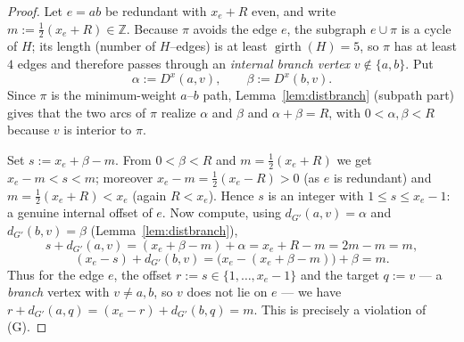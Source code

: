 \documentclass{amsart}
\theoremstyle{definition}
\begin{document}
\begin{proof}
Let $e=ab$ be redundant with $x_e+R$ even, and write $m:=\tfrac12(x_e+R)\in
\mathbb Z$. Because $\pi$ avoids the edge $e$, the subgraph $e\cup\pi$ is a cycle
of $H$; its length (number of $H$--edges) is at least
$\operatorname{girth}(H)=5$, so $\pi$ has at least $4$ edges and therefore passes
through an \emph{internal branch vertex} $v\notin\{a,b\}$. Put
\[
 \alpha:=D^x(a,v),\qquad \beta:=D^x(b,v).
\]
Since $\pi$ is the minimum-weight $a$--$b$ path, Lemma~\ref{lem:distbranch}
(subpath part) gives that the two arcs of $\pi$ realize $\alpha$ and $\beta$ and
$\alpha+\beta=R$, with $0<\alpha,\beta<R$ because $v$ is interior to $\pi$.

Set $s:=x_e+\beta-m$. From $0<\beta<R$ and $m=\tfrac12(x_e+R)$ we get
$x_e-m<s<m$; moreover $x_e-m=\tfrac12(x_e-R)>0$ (as $e$ is redundant) and
$m=\tfrac12(x_e+R)<x_e$ (again $R<x_e$). Hence $s$ is an integer with
$1\le s\le x_e-1$: a genuine internal offset of $e$. Now compute, using
$d_{G'}(a,v)=\alpha$ and $d_{G'}(b,v)=\beta$ (Lemma~\ref{lem:distbranch}),
\[
 s+d_{G'}(a,v)=(x_e+\beta-m)+\alpha=x_e+R-m=2m-m=m,
\]
\[
 (x_e-s)+d_{G'}(b,v)=\big(x_e-(x_e+\beta-m)\big)+\beta=m.
\]
Thus for the edge $e$, the offset $r:=s\in\{1,\dots,x_e-1\}$ and the target
$q:=v$ --- a \emph{branch} vertex with $v\neq a,b$, so $v$ does not lie on $e$
--- we have $r+d_{G'}(a,q)=(x_e-r)+d_{G'}(b,q)=m$. This is precisely a violation
of \textnormal{(G)}.
\end{proof}
\end{document}
